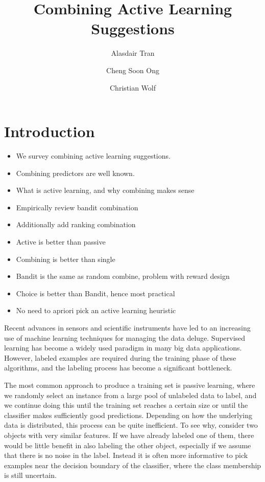 \documentclass[fleqn,10pt,lineno]{wlpeerj} %
\title{Combining Active Learning Suggestions}
\author[1]{Alasdair Tran}
\author[2]{Cheng Soon Ong}
\author[3]{Christian Wolf}
\affil[1]{Computational Media Lab, Australian National University}
\affil[2]{Machine Learning Research Group, Data61, CSIRO, Australia}
\affil[3]{Research School of Astronomy and Astrophysics, Australian National
          University}
\begin{document}
\flushbottom
\maketitle
\thispagestyle{empty}

\section{Introduction}

\begin{itemize}
	\item We survey combining active learning suggestions.
	\item Combining predictors are well known.
	\item What is active learning, and why combining makes sense
	\item Empirically review bandit combination
	\item Additionally add ranking combination
	\item Active is better than passive
	\item Combining is better than single
	\item Bandit is the same as random combine, problem with reward design
	\item Choice is better than Bandit, hence most practical
	\item No need to apriori pick an active learning heuristic
\end{itemize}


Recent advances in sensors and scientific instruments have led to an increasing
use of machine learning techniques for managing the data deluge. Supervised
learning has become a widely used paradigm in many big data applications.
However, labeled examples are required during the training phase of these
algorithms, and the labeling process has become a significant bottleneck.

The most common approach to produce a training set is passive learning, where
we randomly select an instance from a large pool of unlabeled data to label,
and we continue doing this until the training set reaches a certain size or
until the classifier makes sufficiently good predictions. Depending on how the
underlying data is distributed, this process can be quite inefficient. To see
why, consider two objects with very similar features. If we have already
labeled one of them, there would be little benefit in also labeling the other
object, especially if we assume that there is no noise in the label. Instead it
is often more informative to pick examples near the decision boundary of the
classifier, where the class membership is still uncertain.
\end{document}
